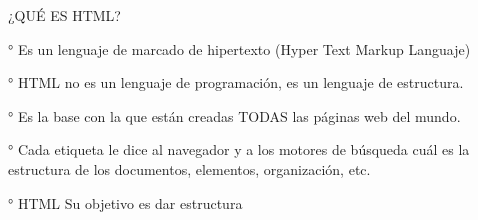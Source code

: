 ¿QUÉ ES HTML?

° Es un lenguaje de marcado de hipertexto (Hyper Text Markup Languaje)


° HTML no es un lenguaje de programación, es un lenguaje de estructura. 


° Es la base con la que están creadas TODAS las páginas web del mundo.


° Cada etiqueta le dice al navegador y a los motores de búsqueda cuál es la estructura de los documentos, elementos, organización, etc.


° HTML Su objetivo es dar estructura 